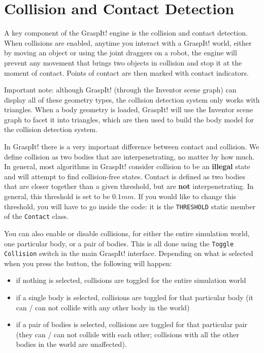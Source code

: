 \section{Collision and Contact Detection}


A key component of the GraspIt! engine is the collision and contact
detection. When collisions are enabled, anytime you interact with a
GraspIt! world, either by moving an object or using the joint draggers
on a robot, the engine will prevent any movement that brings two
objects in collision and stop it at the moment of contact. Points of
contact are then marked with contact indicators.

Important note: although GraspIt! (through the Inventor scene graph)
can display all of these geometry types, the collision detection
system only works with triangles. When a body geometry is loaded,
GraspIt! will use the Inventor scene graph to facet it into triangles,
which are then used to build the body model for the collision
detection system.

In GraspIt! there is a very important difference between contact and
collision. We define collision as two bodies that are
interpenetrating, no matter by how much. In general, most algorithms
in GraspIt! consider collision to be an \textbf{illegal} state and
will attempt to find collision-free states. Contact is defined as two
bodies that are closer together than a given threshold, but are
\textbf{not} interpenetrating. In general, this threshold is set to be
$0.1mm$. If you would like to change this threshold, you will have to
go inside the code: it is the \texttt{THRESHOLD} static member of the
\texttt{Contact} class.

You can also enable or disable collisions, for either the entire
simulation world, one particular body, or a pair of bodies. This is
all done using the \texttt{Toggle Collision} switch in the main
GraspIt!  interface. Depending on what is selected when you press the
button, the following will happen:
\begin{itemize}
\item if nothing is selected, collisions are toggled for the entire
  simulation world
\item if a single body is selected, collisions are toggled for that
  particular body (it can / can not collide with any other body in the
  world)
\item if a pair of bodies is selected, collisions are toggled for that
  particular pair (they can / can not collide with each other;
  collisions with all the other bodies in the world are unaffected).
\end{itemize}

